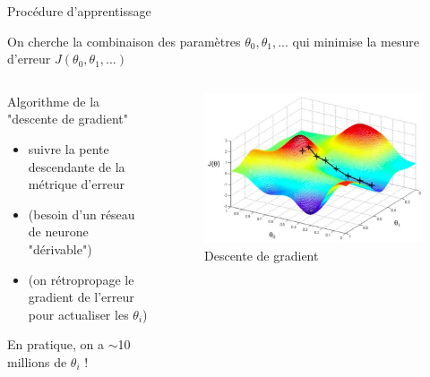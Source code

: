 \documentclass[9pt, aspectratio=169]{beamer}
\begin{document}
\begin{frame}{Procédure d'apprentissage} %

On cherche la combinaison des paramètres $\theta_0, \theta_1, ...$ qui minimise la mesure d'erreur $J(\theta_0, \theta_1, ...)$

\begin{columns}
    \begin{column}{0.48\textwidth}
Algorithme de la "descente de gradient"
	\begin{itemize}\small
		\item suivre la pente descendante de la métrique d'erreur
		\item (besoin d'un réseau de neurone "dérivable")
		\item (on rétropropage le gradient de l'erreur pour actualiser les $\theta_i$)
	\end{itemize}
En pratique, on a $\sim$10 millions de $\theta_i$ !

    \end{column}
    \begin{column}{0.48\textwidth}
    \begin{figure}
		\includegraphics[width=\textwidth]{fig/gradient_descent.jpg}
		\caption{Descente de gradient}
	\end{figure}
    \end{column}
\end{columns}

\end{frame}
\end{document}
